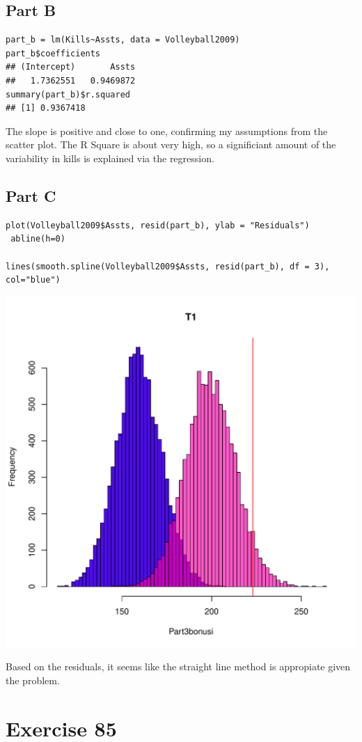 \documentclass{article}\usepackage[]{graphicx}\usepackage[]{color}
\makeatletter
\newenvironment{kframe}{%
 \def\at@end@of@kframe{}%
 \ifinner\ifhmode%
  \def\at@end@of@kframe{\end{minipage}}%
  \begin{minipage}{\columnwidth}%
 \fi\fi%
 \def\FrameCommand##1{\hskip\@totalleftmargin \hskip-\fboxsep
 \colorbox{shadecolor}{##1}\hskip-\fboxsep
     \hskip-\linewidth \hskip-\@totalleftmargin \hskip\columnwidth}%
 \MakeFramed {\advance\hsize-\width
   \@totalleftmargin\z@ \linewidth\hsize
   \@setminipage}}%
 {\par\unskip\endMakeFramed%
 \at@end@of@kframe}
\newenvironment{knitrout}{}{} %
\makeatother
\begin{document}
\subsection*{Part B}
\begin{knitrout}
\color{fgcolor}\begin{kframe}
\begin{verbatim}
part_b = lm(Kills~Assts, data = Volleyball2009)
part_b$coefficients
## (Intercept)       Assts 
##   1.7362551   0.9469872
summary(part_b)$r.squared
## [1] 0.9367418
\end{verbatim}
\end{kframe}
\end{knitrout}
The slope is positive and close to one, confirming my assumptions from the scatter plot. The R Square is about very high, so a significiant amount of the variability in kills is explained via the regression.
\subsection*{Part C}
\begin{knitrout}
\color{fgcolor}\begin{kframe}
\begin{verbatim}
plot(Volleyball2009$Assts, resid(part_b), ylab = "Residuals")
 abline(h=0)
 
lines(smooth.spline(Volleyball2009$Assts, resid(part_b), df = 3),
col="blue") 
\end{verbatim}
\end{kframe}
\includegraphics[width=0.33\linewidth]{figure/unnamed-chunk-10-1} 

\end{knitrout}
Based on the residuals, it seems like the straight line method is appropiate given the problem. 
\section*{Exercise 85}
\end{document}
